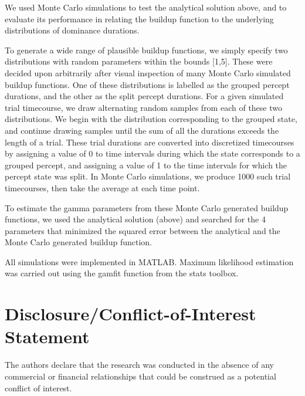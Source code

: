 \documentclass{frontiersSCNS} %
\begin{document}
We used Monte Carlo simulations to test the analytical solution above, and to evaluate its performance in relating the buildup function to the underlying distributions of dominance durations.

To generate a wide range of plausible buildup functions, we simply specify two distributions with random parameters within the bounds [1,5]. These were decided upon arbitrarily after visual inspection of many Monte Carlo simulated buildup functions. One of these distributions is labelled as the grouped percept durations, and the other as the split percept durations. For a given simulated trial timecourse, we draw alternating random samples from each of these two distributions. We begin with the distribution corresponding to the grouped state, and continue drawing samples until the sum of all the durations exceeds the length of a trial. These trial durations are converted into discretized timecourses by assigning a value of 0 to time intervals during which the state corresponds to a grouped percept, and assigning a value of 1 to the time intervals for which the percept state was split. In Monte Carlo simulations, we produce 1000 such trial timecourses, then take the average at each time point.

To estimate the gamma parameters from these Monte Carlo generated buildup functions, we used the analytical solution (above) and searched for the 4 parameters that minimized the squared error between the analytical and the Monte Carlo generated buildup function. 

All simulations were implemented in MATLAB. Maximum likelihood estimation was carried out using the gamfit function from the stats toolbox. 



\section*{Disclosure/Conflict-of-Interest Statement}
The authors declare that the research was conducted in the absence of any commercial or financial relationships that could be construed as a potential conflict of interest.
\end{document}
